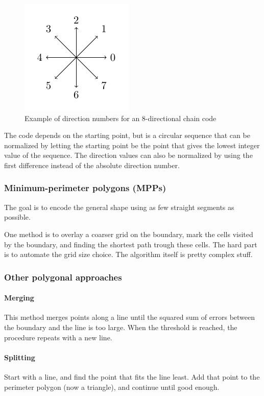 \begin{figure}[htbp]
    \centering
    \includegraphics[width=0.3\linewidth]{images/chain-code-dir-num}
    \caption{Example of direction numbers for an 8-directional chain code}
    \label{fig:direction-numbers}
\end{figure}

The code depends on the starting point, but is a circular sequence that can be normalized by letting the starting point be the point that gives the lowest integer value of the sequence. The direction values can also be normalized by using the first difference instead of the absolute direction number.

\subsubsection{Minimum-perimeter polygons (MPPs)}
The goal is to encode the general shape using as few straight segments as possible.

One method is to overlay a coarser grid on the boundary, mark the cells visited by the boundary, and finding the shortest path trough these cells. The hard part is to automate the grid size choice. The algorithm itself is pretty complex stuff.

\subsubsection{Other polygonal approaches}
\paragraph{Merging} This method merges points along a line until the squared sum of errors between the boundary and the line is too large. When the threshold is reached, the procedure repeats with a new line.
\paragraph{Splitting} Start with a line, and find the point that fits the line least. Add that point to the perimeter polygon (now a triangle), and continue until good enough.

